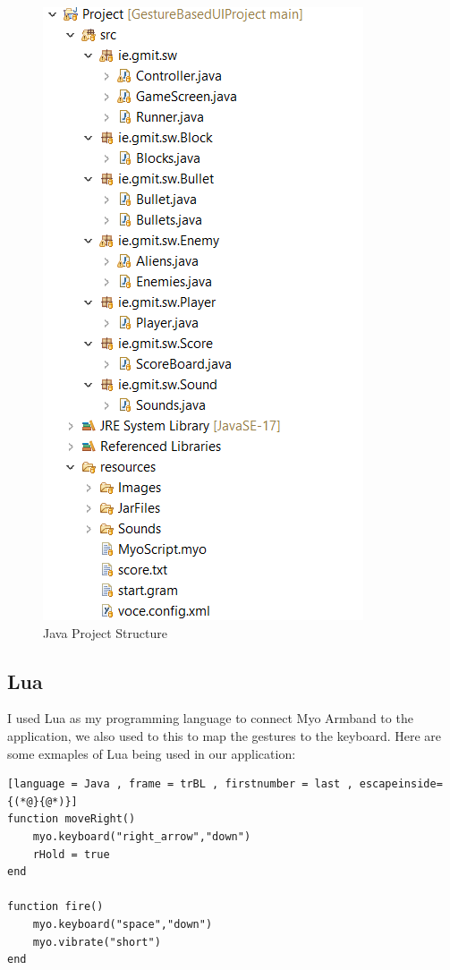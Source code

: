 \documentclass{article}
\begin{document}
\begin{figure}[h]
    \includegraphics[scale=0.6]{img/javastructure.png}
    \centering
    \caption{Java Project Structure}
    \label{fig: A Picture of the Java Project Structure}
\end{figure}

\subsection{Lua}

\hfill \break
I used Lua as my programming language to connect Myo Armband to the application, we also used to this to map the gestures to the keyboard. Here are some exmaples of Lua being used in our application:

\begin{lstlisting}[language = Java , frame = trBL , firstnumber = last , escapeinside={(*@}{@*)}]
function moveRight()
	myo.keyboard("right_arrow","down")
    rHold = true
end

function fire()
	myo.keyboard("space","down")
    myo.vibrate("short")
end
\end{lstlisting}
\end{document}
